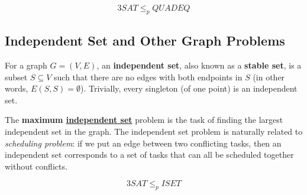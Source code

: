   \begin{theorem}
    \label{thm:hardness-of-quadratic-equations}
  \begin{equation}
    3SAT \leq_p QUADEQ
  \end{equation}
  \end{theorem}

\subsection{Independent Set and Other Graph Problems}

  \begin{definition}
    \label{def:independent-set}
  For a graph $G = (V, E)$, an \textbf{independent set}, also known as a \textbf{stable set}, is a subset $S \subseteq V$ such that there are no edges with both endpoints in $S$ (in other words, $E(S, S) = \emptyset$). Trivially, every singleton (of one point) is an independent set. 
  \end{definition}

  The \textbf{maximum \hyperref[def:independent-set]{independent set}} problem is the task of finding the largest independent set in the graph. The independent set problem is naturally related to \textit{scheduling problem}: if we put an edge between two conflicting tasks, then an independent set corresponds to a set of tasks that can all be scheduled together without conflicts. 

  \begin{theorem}
    \label{thm:hardness-of-independent-set}
  \begin{equation}
    3SAT \leq_p ISET
  \end{equation}
  \end{theorem}

